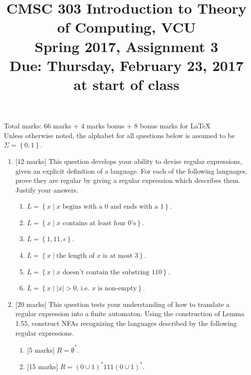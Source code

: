 \documentclass{article}
\newcommand{\set}[1]{{\left\{#1\right\}}}    %
\newcommand{\abs}[1]{\left\lvert #1 \right\rvert}
\begin{document}
\title{CMSC 303 Introduction to Theory of Computing, VCU\\Spring 2017, Assignment 3\\Due: Thursday, February 23, 2017 at start of class}
\date{}
\maketitle
\noindent Total marks: $66$ marks $+$ $4$ marks bonus $+$ $8$ bonus marks for LaTeX\\

\noindent Unless otherwise noted, the alphabet for all questions below is assumed to be $\Sigma=\set{0,1}$.
\begin{enumerate}
    \item {[12 marks]} This question develops your ability to devise regular expressions, given an explicit definition of a language. For each of the following languages, prove they are regular by giving a regular expression which describes them. Justify your answers.
        \begin{enumerate}
            \item $L=\set{x\mid x \text{ begins with a $0$ and ends with a $1$}}$.
            \item $L=\set{x\mid x \text{ contains at least four $0$'s}}$.
            \item $L=\set{1, 11, \epsilon}$.
            \item $L=\set{x\mid \text{the length of $x$ is at most $3$}}$.
            \item $L=\set{x\mid x \text{ doesn't contain the substring $110$}}$.
            \item $L=\set{x \mid \abs{x}>0 \text{, i.e. $x$ is non-empty}}$.
        \end{enumerate}
    \item {[20 marks]} This question tests your understanding of how to translate a regular expression into a finite automaton. Using the construction of Lemma 1.55, construct NFAs recognizing the languages described by the following regular expressions.
        \begin{enumerate}
            \item {[5 marks]} $R=\emptyset^*$.
            \item {[15 marks]} $R=(0\cup 1)^*111(0\cup 1)^*$.
        \end{enumerate}

\end{enumerate}
\end{document}
